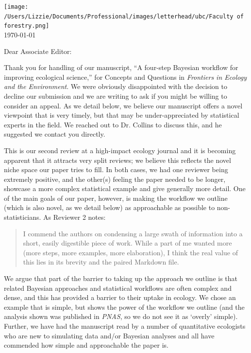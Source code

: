 \documentclass[11pt]{article}
\begin{document}

\renewcommand{\refname}{\CHead{}}

\hspace{-5ex} \texttt{[image: /Users/Lizzie/Documents/Professional/images/letterhead/ubc/Faculty of forestry.png]}
\vspace{1.5ex}\\

\setlength{\parindent}{0pt}
\setlength{\parskip}{7pt}
\today

Dear Associate Editor:

Thank you for handling of our manuscript, ``A four-step Bayesian workflow for improving ecological science,'' for Concepts and Questions in \emph{Frontiers in Ecology and the Environment}. We were obviously disappointed with the decision to decline our submission and we are writing to ask if you might be willing to consider an appeal. As we detail below, we believe our manuscript offers a novel viewpoint that is very timely, but that may be under-appreciated by statistical experts in the field. We reached out to Dr. Collins to discuss this, and he suggested we contact you directly. 

This is our second review at a high-impact ecology journal and it is becoming apparent that it attracts very split reviews; we believe this reflects the novel niche space our paper tries to fill. In both cases, we had one reviewer being extremely positive, and the other(s) feeling the paper needed to be longer, showcase a more complex statistical example and give generally more detail. One of the main goals of our paper, however, is making the workflow we outline (which is also novel, as we detail below) as approachable as possible to non-statisticians. As Reviewer 2 notes:
\begin{quote}
I commend the authors on condensing a large swath of information into a short, easily digestible piece of work. While a part of me
wanted more (more steps, more examples, more elaboration), I think the real value of this lies in its
brevity and the paired Markdown file.
\end{quote}
We argue that part of the barrier to taking up the approach we outline is that related Bayesian approaches and statistical workflows are often complex and dense, and this has provided a barrier to their uptake in ecology. We chose an example that is simple, but shows the power of the workflow we outline (and the analysis shown was published in \emph{PNAS}, so we do not see it as `overly' simple). Further, we have had the manuscript read by a number of quantitative ecologists who are new to simulating data and/or Bayesian analyses and all have commended how simple and approachable the paper is. 
\end{document}
